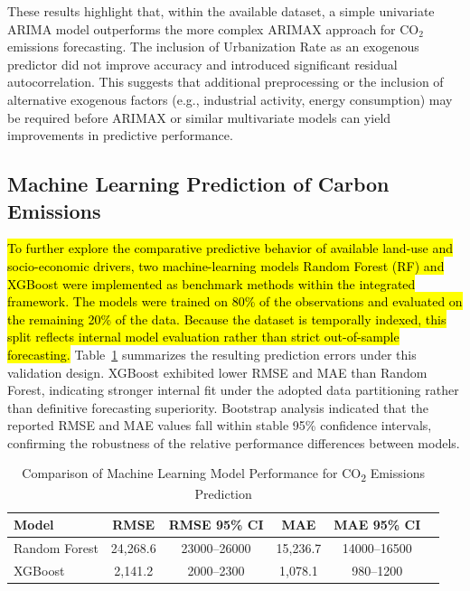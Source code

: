 \documentclass[10pt,letterpaper]{article}
\begin{document}
These results highlight that, within the available dataset, a simple univariate ARIMA model outperforms the more complex ARIMAX approach for CO$_2$ emissions forecasting. The inclusion of Urbanization Rate as an exogenous predictor did not improve accuracy and introduced significant residual autocorrelation. This suggests that additional preprocessing or the inclusion of alternative exogenous factors (e.g., industrial activity, energy consumption) may be required before ARIMAX or similar multivariate models can yield improvements in predictive performance.


\subsection{Machine Learning Prediction of Carbon Emissions}

\hl{To further explore the comparative predictive behavior of available land-use and socio-economic drivers, two machine-learning models Random Forest (RF) and XGBoost were implemented as benchmark methods within the integrated framework. The models were trained on 80\% of the observations and evaluated on the remaining 20\% of the data. Because the dataset is temporally indexed, this split reflects internal model evaluation rather than strict out-of-sample forecasting.} Table~\ref{tab:ml_results} summarizes the resulting prediction errors under this validation design. XGBoost exhibited lower RMSE and MAE than Random Forest, indicating stronger internal fit under the adopted data partitioning rather than definitive forecasting superiority. Bootstrap analysis indicated that the reported RMSE and MAE values fall within stable 95\% confidence intervals, confirming the robustness of the relative performance differences between models.


\begin{table}[h!]
	\centering
	\caption{Comparison of Machine Learning Model Performance for CO\textsubscript{2} Emissions Prediction}
	\label{tab:ml_results}
	\begin{tabular}{lccccc}
		\hline
		Model & RMSE &RMSE 95\% CI&MAE&MAE 95\% CI& \\
		\hline
		Random Forest & 24,268.6 &23000–26000 &15,236.7&14000–16500& \\
		XGBoost & 2,141.2 &2000–2300 &1,078.1&980–1200& \\
		\hline
	\end{tabular}
\end{table}
\end{document}
